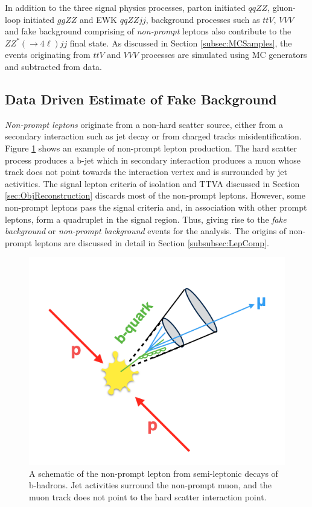 In addition to the three signal physics processes, parton initiated $qqZZ$, gluon-loop initiated $ggZZ$ and EWK $qqZZjj$, background processes such as $ttV$, $VVV$ and fake background comprising of \textit{non-prompt} leptons also contribute to the $ZZ^*(\rightarrow 4\ell) jj$ final state. As discussed in Section \ref{subsec:MCSamples}, the events originating from $ttV$ and $VVV$ processes are simulated using MC generators and subtracted from data.

\subsection{Data Driven Estimate of Fake Background}
\label{subsec:FakeBackground}

\textit{Non-prompt leptons} originate from a non-hard scatter source, either from a secondary interaction such as jet decay or from charged tracks misidentification. Figure \ref{fig:NonPromptLepton} shows an example of non-prompt lepton production. The hard scatter process produces a b-jet which in secondary interaction produces a muon whose track does not point towards the interaction vertex and is surrounded by jet activities. The signal lepton criteria of isolation and TTVA discussed in Section \ref{sec:ObjReconstruction} discards most of the non-prompt leptons. However, some non-prompt leptons pass the signal criteria and, in association with other prompt leptons, form a quadruplet in the signal region. Thus, giving rise to the \textit{fake background} or \textit{non-prompt background} events for the analysis. The origins of non-prompt leptons are discussed in detail in Section \ref{subsubsec:LepComp}.

\begin{figure}[!htb]
    \centering
    \includegraphics[width=.7\linewidth]{figures/Analysis/Background/NonPromptLeptonExample.png}  
    \caption{A schematic of the non-prompt lepton from semi-leptonic decays of b-hadrons. Jet activities surround the non-prompt muon, and the muon track does not point to the hard scatter interaction point.\label{fig:NonPromptLepton}}
\end{figure}

